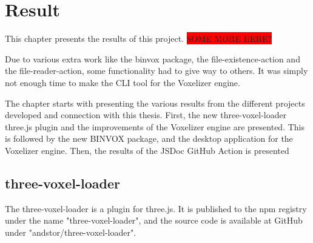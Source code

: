 \chapter{Result}
This chapter presents the results of this project. \colorbox{red}{SOME MORE HERE?}

Due to various extra work like the binvox package, the file-existence-action and the file-reader-action, some functionality had to give way to others. It was simply not enough time to make the CLI tool for the Voxelizer engine.

The chapter starts with presenting the various results from the different projects developed and connection with this thesis. First, the new three-voxel-loader three.js plugin and the improvements of the Voxelizer engine are presented. This is followed by the new BINVOX package, and the desktop application for the Voxelizer engine. Then, the results of the JSDoc GitHub Action is presented

\section{three-voxel-loader}
The three-voxel-loader is a plugin for three.js. It is published to the npm registry under the name "three-voxel-loader", and the source code is available at GitHub under "andstor/three-voxel-loader".

